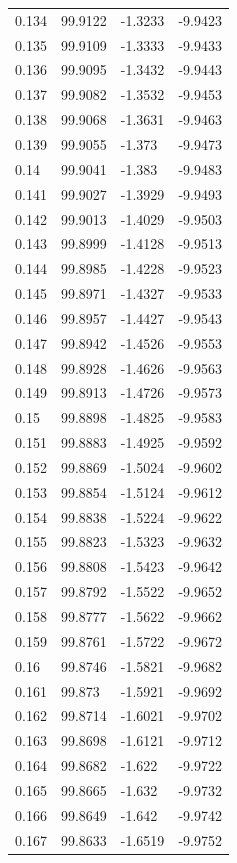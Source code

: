 \begin{tabular}{llll}
0.134 & 99.9122 & -1.3233 & -9.9423 \\
0.135 & 99.9109 & -1.3333 & -9.9433 \\
0.136 & 99.9095 & -1.3432 & -9.9443 \\
0.137 & 99.9082 & -1.3532 & -9.9453 \\
0.138 & 99.9068 & -1.3631 & -9.9463 \\
0.139 & 99.9055 & -1.373 & -9.9473 \\
0.14 & 99.9041 & -1.383 & -9.9483 \\
0.141 & 99.9027 & -1.3929 & -9.9493 \\
0.142 & 99.9013 & -1.4029 & -9.9503 \\
0.143 & 99.8999 & -1.4128 & -9.9513 \\
0.144 & 99.8985 & -1.4228 & -9.9523 \\
0.145 & 99.8971 & -1.4327 & -9.9533 \\
0.146 & 99.8957 & -1.4427 & -9.9543 \\
0.147 & 99.8942 & -1.4526 & -9.9553 \\
0.148 & 99.8928 & -1.4626 & -9.9563 \\
0.149 & 99.8913 & -1.4726 & -9.9573 \\
0.15 & 99.8898 & -1.4825 & -9.9583 \\
0.151 & 99.8883 & -1.4925 & -9.9592 \\
0.152 & 99.8869 & -1.5024 & -9.9602 \\
0.153 & 99.8854 & -1.5124 & -9.9612 \\
0.154 & 99.8838 & -1.5224 & -9.9622 \\
0.155 & 99.8823 & -1.5323 & -9.9632 \\
0.156 & 99.8808 & -1.5423 & -9.9642 \\
0.157 & 99.8792 & -1.5522 & -9.9652 \\
0.158 & 99.8777 & -1.5622 & -9.9662 \\
0.159 & 99.8761 & -1.5722 & -9.9672 \\
0.16 & 99.8746 & -1.5821 & -9.9682 \\
0.161 & 99.873 & -1.5921 & -9.9692 \\
0.162 & 99.8714 & -1.6021 & -9.9702 \\
0.163 & 99.8698 & -1.6121 & -9.9712 \\
0.164 & 99.8682 & -1.622 & -9.9722 \\
0.165 & 99.8665 & -1.632 & -9.9732 \\
0.166 & 99.8649 & -1.642 & -9.9742 \\
0.167 & 99.8633 & -1.6519 & -9.9752 \\

\end{tabular}
